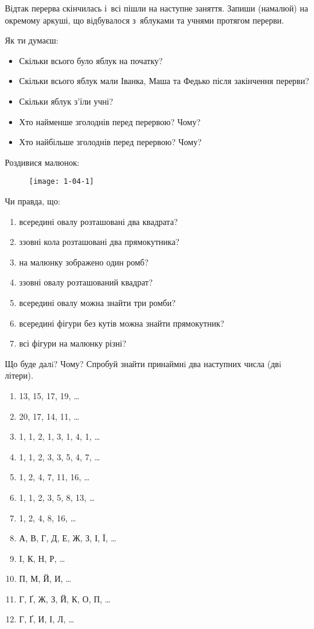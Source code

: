 Відтак перерва скінчилась і~всі пішли на наступне заняття.
Запиши (намалюй) на окремому аркуші, що відбувалося з~яблуками
та учнями протягом перерви.

Як ти думаєш:
\begin{itemize}
  \item Скільки всього було яблук на початку?
  \item Скільки всього яблук мали Іванка, Маша та Федько
  після закінчення перерви?
  \item Скільки яблук з'їли учні?
  \item Хто найменше зголоднів перед перервою? Чому?
  \item Хто найбільше зголоднів перед перервою? Чому?
\end{itemize}


\problem
Роздивися малюнок:

\begin{figure}[ht]
  \centering
  \texttt{[image: 1-04-1]}
\end{figure}

Чи правда, що:
\begin{enumerate}
  \item всередині овалу розташовані два квадрата?
  \item ззовні кола розташовані два прямокутника?
  \item на малюнку зображено один ромб?
  \item ззовні овалу розташований квадрат?
  \item всередині овалу можна знайти три ромби?
  \item всередині фігури без кутів можна знайти прямокутник?
  \item всі фігури на малюнку різні?
\end{enumerate}



\problem
Що буде далi? Чому?
Спробуй знайти принаймнi два наступних числа (двi літери).
\begin{enumerate}
  \item 13, 15, 17, 19, \ldots
  \item 20, 17, 14, 11, \ldots
  \item 1, 1, 2, 1, 3, 1, 4, 1, \ldots
  \item 1, 1, 2, 3, 3, 5, 4, 7, \ldots
  \item 1, 2, 4, 7, 11, 16, \ldots
  \item 1, 1, 2, 3, 5, 8, 13, \ldots
  \item 1, 2, 4, 8, 16, \ldots
  \item А, В, Г, Д, Е, Ж, З, І, Ї, \ldots
  \item I, К, Н, Р, \ldots
  \item П, М, Й, И, \ldots
  \item Г, Ґ, Ж, З, Й, К, О, П, \ldots
  \item Г, Ґ, И, І, Л, \ldots
\end{enumerate}


